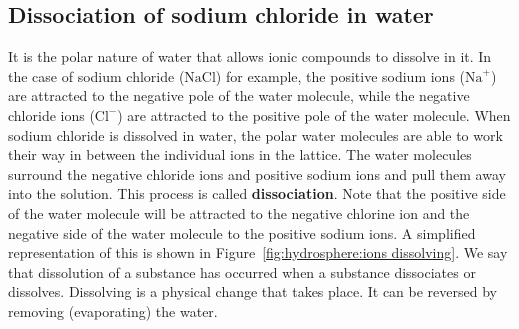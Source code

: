 \subsection*{Dissociation of sodium chloride in water}       
        \label{m38720*id335349}It is the polar nature of water that allows ionic compounds to dissolve in it. In the case of sodium chloride ($\text{NaCl}$) for example, the positive sodium ions (${\text{Na}}^{+}$) are attracted to the negative pole of the water molecule, while the negative chloride ions (${\text{Cl}}^{-}$) are attracted to the positive pole of the water molecule. When sodium chloride is dissolved in water, the polar water molecules are able to work their way in between the individual ions in the lattice. The water molecules surround the negative chloride ions and positive sodium ions and pull them away into the solution. This process is called \textbf{dissociation}. Note that the positive side of the water molecule will be attracted to the negative chlorine ion and the negative side of the water molecule to the positive sodium ions. A simplified representation of this is shown in Figure~\ref{fig:hydrosphere:ions dissolving}. We say that dissolution of a substance has occurred when a substance dissociates or dissolves. Dissolving is a physical change that takes place. It can be reversed by removing (evaporating) the water.\par 
\label{m38720*fhsst!!!underscore!!!id155}
    \setcounter{subfigure}{0}
